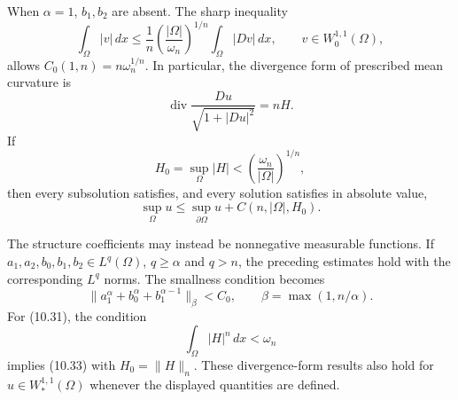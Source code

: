 When $\alpha=1$, $b_1,b_2$ are absent.  The sharp inequality
\begin{equation}
\int_\Omega|v|\,dx\le\frac1n
\left(\frac{|\Omega|}{\omega_n}\right)^{1/n}
\int_\Omega|Dv|\,dx,
\qquad v\in W^{1,1}_0(\Omega),
\tag{10.30}
\end{equation}
allows $C_0(1,n)=n\omega_n^{1/n}$.  In particular, the divergence form
of prescribed mean curvature is
\begin{equation}
\operatorname{div}\frac{Du}{\sqrt{1+|Du|^2}}=nH.
\tag{10.31}
\end{equation}
If
\begin{equation}
H_0=\sup_\Omega|H|<\left(\frac{\omega_n}{|\Omega|}\right)^{1/n},
\tag{10.32}
\end{equation}
then every subsolution satisfies, and every solution satisfies in absolute
value,
\begin{equation}
\sup_\Omega u\le\sup_{\partial\Omega}u+C(n,|\Omega|,H_0).
\tag{10.33}
\end{equation}

The structure coefficients may instead be nonnegative measurable functions.
If $a_1,a_2,b_0,b_1,b_2\in L^q(\Omega)$, $q\ge\alpha$ and $q>n$, the
preceding estimates hold with the corresponding $L^q$ norms.  The smallness
condition becomes
\begin{equation}
\|a_1^\alpha+b_0^\alpha+b_1^{\alpha-1}\|_\beta<C_0,
\qquad \beta=\max(1,n/\alpha).
\tag{10.34}
\end{equation}
For \textup{(10.31)}, the condition
\begin{equation}
\int_\Omega|H|^n\,dx<\omega_n
\tag{10.35}
\end{equation}
implies \textup{(10.33)} with $H_0=\|H\|_n$.  These divergence-form
results also hold for $u\in W^{1,1}_*(\Omega)$ whenever the displayed
quantities are defined.
